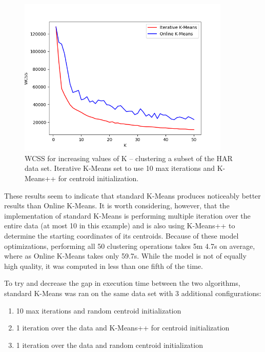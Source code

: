 \documentclass{l4proj}
\begin{document}
\begin{figure}[H]
	\centering
    \label{fig:res2}
    \includegraphics[width=0.9\textwidth]{images/result2}
    \caption{WCSS for increasing values of K -- clustering a subset of the HAR data set. Iterative K-Means set to use 10 max iterations and K-Means++ for centroid initialization. } 
\end{figure}

These results seem to indicate that standard K-Means produces noticeably better results than Online K-Means. It is worth considering, however, that the implementation of standard K-Means is performing multiple iteration over the entire data (at most 10 in this example) and is also using K-Means++ to determine the starting coordinates of its centroids. Because of these model optimizations, performing all 50 clustering operations takes 5m 4.7s on average, where as Online K-Means takes only 59.7s. While the model is not of equally high quality, it was computed in less than one fifth of the time.

To try and decrease the gap in execution time between the two algorithms, standard K-Means was ran on the same data set with 3 additional configurations:

\begin{enumerate}
\item 10 max iterations and random centroid initialization
\item 1 iteration over the data and K-Means++ for centroid initialization
\item 1 iteration over the data and random centroid initialization
\end{enumerate}
\end{document}

